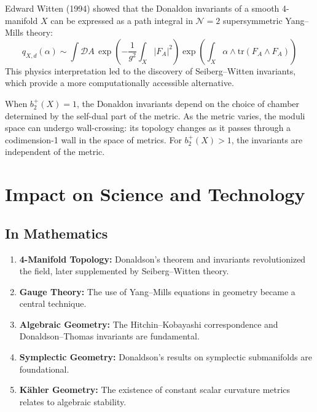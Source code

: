 \begin{remark}
Edward Witten (1994) showed that the Donaldon invariants of a smooth 4-manifold $X$ can be expressed as a path integral in $\mathcal{N}=2$ supersymmetric Yang--Mills theory:
\[
q_{X,d}(\alpha) \sim \int \mathcal{D}A \, \exp\left(-\frac{1}{g^2}\int_X |F_A|^2\right) \exp\left(\int_X \alpha \wedge \mathrm{tr}(F_A \wedge F_A)\right)
\]
This physics interpretation led to the discovery of Seiberg--Witten invariants, which provide a more computationally accessible alternative.
\end{remark}

\begin{remark}
When $b_2^+(X) = 1$, the Donaldon invariants depend on the choice of chamber determined by the self-dual part of the metric. As the metric varies, the moduli space can undergo wall-crossing: its topology changes as it passes through a codimension-1 wall in the space of metrics. For $b_2^+(X) > 1$, the invariants are independent of the metric.
\end{remark}

\section{Impact on Science and Technology}

\subsection{In Mathematics}

\begin{enumerate}
    \item \textbf{4-Manifold Topology:} Donaldson's theorem and invariants revolutionized the field, later supplemented by Seiberg--Witten theory.
    \item \textbf{Gauge Theory:} The use of Yang--Mills equations in geometry became a central technique.
    \item \textbf{Algebraic Geometry:} The Hitchin--Kobayashi correspondence and Donaldson--Thomas invariants are fundamental.
    \item \textbf{Symplectic Geometry:} Donaldson's results on symplectic submanifolds are foundational.
    \item \textbf{K\"ahler Geometry:} The existence of constant scalar curvature metrics relates to algebraic stability.
\end{enumerate}

